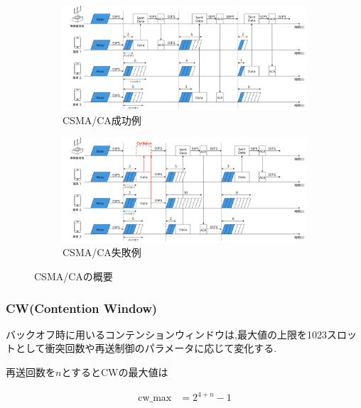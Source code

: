 \documentclass[a4paper, 10pt]{ltjsarticle}
\begin{document}
\begin{figure}[H]
  \centering

  \begin{subfigure}{\columnwidth}
    \centering
    \includegraphics[width=1\columnwidth]{./assets/csma-ca-s.png}
    \caption{CSMA/CA成功例}
    \label{1a}
  \end{subfigure}


  \begin{subfigure}{\columnwidth}
    \centering
    \includegraphics[width=1\columnwidth]{./assets/csma-ca-f.png}
    \caption{CSMA/CA失敗例}
    \label{1b}
  \end{subfigure}


  \caption{CSMA/CAの概要}
  \label{CSMA/CA}
\end{figure}

\subsubsection{CW(Contention Window)}

バックオフ時に用いるコンテンションウィンドウは,最大値の上限を1023スロットとして衝突回数や再送制御のパラメータに応じて変化する.

再送回数を$n$とするとCWの最大値は



\begin{align}
  \text{cw\_max} &= 2^{4 + n} - 1
\end{align}
\end{document}
